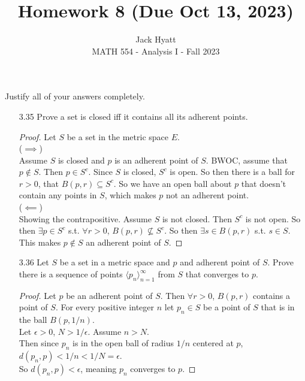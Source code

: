 \documentclass[14pt]{extarticle}
\begin{document}
	
	
	
	\title{Homework 8 (Due Oct 13, 2023)}
	\author{Jack Hyatt\\ %
		MATH 554 - Analysis I - Fall 2023} 
	
	\maketitle
	
	Justify all of your answers completely.\\
	
	
	\medskip 
	
	\begin{enumerate}
		\item[3.35] Prove a set is closed iff it contains all its adherent points.
		\begin{proof}
			Let $S$ be a set in the metric space $E$.\\
			($\implies$)\\
			Assume $S$ is closed and $p$ is an adherent point of $S$. BWOC, assume that $p \nin S$. Then $p \in S^c$. Since $S$ is closed, $S^c$ is open. So then there is a ball for $r>0$, that $B(p,r)\subseteq S^c$. So we have an open ball about $p$ that doesn't contain any points in $S$, which makes $p$ not an adherent point. \contra\\
			($\impliedby$)\\
			Showing the contrapositive. Assume $S$ is not closed. Then $S^c$ is not open. So then $\exists p\in S^c$ s.t. $\forall r>0$, $B(p,r) \nsubseteq S^c$. So then $\exists s \in B(p,r)$ s.t. $s \in S$. This makes $p \nin S$ an adherent point of $S$. 
		\end{proof}
		
		\item[3.36] Let $S$ be a set in a metric space and $p$ and adherent point of $S$. Prove there is a sequence of points $\langle p_n \rangle^\infty_{n=1}$ from $S$ that converges to $p$.
		\begin{proof}
			Let $p$ be an adherent point of $S$. Then $\forall r>0$, $B(p,r)$ contains a point of $S$. For every positive integer $n$ let $p_n \in S$ be a point of $S$ that is in the ball $B(p,1/n)$.\\
			Let $\epsilon>0$, $N>1/\epsilon$. Assume $n>N$.\\
			Then since $p_n$ is in the open ball of radius $1/n$ centered at $p$,\\ $d(p_n,p) < 1/n < 1/N =\epsilon$.\\
			So $d(p_n,p) < \epsilon$, meaning $p_n$ converges to $p$. 
		\end{proof}
		

\end{enumerate}
\end{document}
